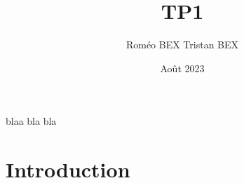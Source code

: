 \documentclass{article}
\title{TP1 }
\author{Roméo BEX Tristan BEX}
\date{Août 2023}
\begin{document}
blaa bla bla 


\maketitle

\section{Introduction}
\end{document}

